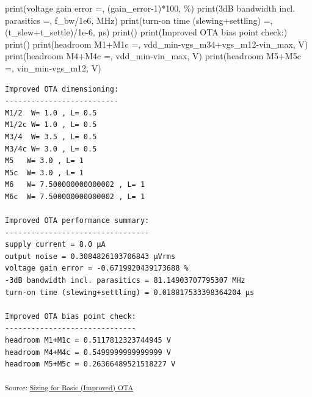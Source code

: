 \documentclass[
  a4paper,
  DIV=11,
  numbers=noendperiod]{scrartcl}
\newenvironment{Shaded}{\begin{snugshade}}{\end{snugshade}}
\newcommand{\BuiltInTok}[1]{\textcolor[rgb]{0.00,0.23,0.31}{#1}}
\newcommand{\DecValTok}[1]{\textcolor[rgb]{0.68,0.00,0.00}{#1}}
\newcommand{\FloatTok}[1]{\textcolor[rgb]{0.68,0.00,0.00}{#1}}
\newcommand{\NormalTok}[1]{\textcolor[rgb]{0.00,0.23,0.31}{#1}}
\newcommand{\OperatorTok}[1]{\textcolor[rgb]{0.37,0.37,0.37}{#1}}
\newcommand{\StringTok}[1]{\textcolor[rgb]{0.13,0.47,0.30}{#1}}
\begin{document}
\begin{tcolorbox}
\begin{Shaded}
\begin{Highlighting}[]
\BuiltInTok{print}\NormalTok{(}\StringTok{\textquotesingle{}voltage gain error =\textquotesingle{}}\NormalTok{, (gain\_error}\OperatorTok{{-}}\DecValTok{1}\NormalTok{)}\OperatorTok{*}\DecValTok{100}\NormalTok{, }\StringTok{\textquotesingle{}\%\textquotesingle{}}\NormalTok{)}
\BuiltInTok{print}\NormalTok{(}\StringTok{\textquotesingle{}{-}3dB bandwidth incl. parasitics =\textquotesingle{}}\NormalTok{, f\_bw}\OperatorTok{/}\FloatTok{1e6}\NormalTok{, }\StringTok{\textquotesingle{}MHz\textquotesingle{}}\NormalTok{)}
\BuiltInTok{print}\NormalTok{(}\StringTok{\textquotesingle{}turn{-}on time (slewing+settling) =\textquotesingle{}}\NormalTok{, (t\_slew}\OperatorTok{+}\NormalTok{t\_settle)}\OperatorTok{/}\FloatTok{1e{-}6}\NormalTok{, }\StringTok{\textquotesingle{}µs\textquotesingle{}}\NormalTok{)}
\BuiltInTok{print}\NormalTok{()}
\BuiltInTok{print}\NormalTok{(}\StringTok{\textquotesingle{}Improved OTA bias point check:\textquotesingle{}}\NormalTok{)}
\BuiltInTok{print}\NormalTok{(}\StringTok{\textquotesingle{}{-}{-}{-}{-}{-}{-}{-}{-}{-}{-}{-}{-}{-}{-}{-}{-}{-}{-}{-}{-}{-}{-}{-}{-}{-}{-}{-}{-}{-}{-}\textquotesingle{}}\NormalTok{)}
\BuiltInTok{print}\NormalTok{(}\StringTok{\textquotesingle{}headroom M1+M1c =\textquotesingle{}}\NormalTok{, vdd\_min}\OperatorTok{{-}}\NormalTok{vgs\_m34}\OperatorTok{+}\NormalTok{vgs\_m12}\OperatorTok{{-}}\NormalTok{vin\_max, }\StringTok{\textquotesingle{}V\textquotesingle{}}\NormalTok{)}
\BuiltInTok{print}\NormalTok{(}\StringTok{\textquotesingle{}headroom M4+M4c =\textquotesingle{}}\NormalTok{, vdd\_min}\OperatorTok{{-}}\NormalTok{vin\_max, }\StringTok{\textquotesingle{}V\textquotesingle{}}\NormalTok{)}
\BuiltInTok{print}\NormalTok{(}\StringTok{\textquotesingle{}headroom M5+M5c =\textquotesingle{}}\NormalTok{, vin\_min}\OperatorTok{{-}}\NormalTok{vgs\_m12, }\StringTok{\textquotesingle{}V\textquotesingle{}}\NormalTok{)}
\end{Highlighting}
\end{Shaded}

\begin{verbatim}
Improved OTA dimensioning:
--------------------------
M1/2  W= 1.0 , L= 0.5
M1/2c W= 1.0 , L= 0.5
M3/4  W= 3.5 , L= 0.5
M3/4c W= 3.0 , L= 0.5
M5   W= 3.0 , L= 1
M5c  W= 3.0 , L= 1
M6   W= 7.500000000000002 , L= 1
M6c  W= 7.500000000000002 , L= 1

Improved OTA performance summary:
---------------------------------
supply current = 8.0 µA
output noise = 0.3084826103706843 µVrms
voltage gain error = -0.6719920439173688 %
-3dB bandwidth incl. parasitics = 81.14903707795307 MHz
turn-on time (slewing+settling) = 0.018817533398364204 µs

Improved OTA bias point check:
------------------------------
headroom M1+M1c = 0.5117812323744945 V
headroom M4+M4c = 0.5499999999999999 V
headroom M5+M5c = 0.26366489521518227 V
\end{verbatim}

\textsubscript{Source:
\href{https://iic-jku.github.io/analog-circuit-design/sizing/sizing_basic_ota_improved-preview.html\#cell-0}{Sizing
for Basic (Improved) OTA}}

\end{tcolorbox}
\end{document}

